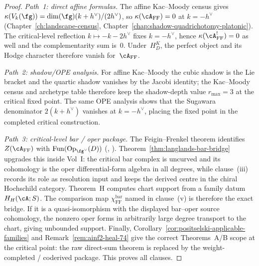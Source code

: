 \begin{proof}
\emph{Path~1: direct affine formulas.}
The affine Kac--Moody census gives
$\kappa(V_k(\fg)) = \dim(\fg)(k+h^\vee)/(2h^\vee)$, so
$\kappa(\cA_{\mathrm{FF}})=0$ at $k=-h^\vee$
\textup{(}Chapter~\ref{ch:landscape-census},
Chapter~\ref{chap:shadow-quadrichotomy-platonic}\textup{)}.
The critical-level reflection \(k \mapsto -k-2h^\vee\) fixes
$k=-h^\vee$, hence $\kappa(\cA_{\mathrm{FF}}^{!})=0$ as well and the
complementarity sum is~$0$.  Under~$H_D^K$, the perfect object and
its Hodge character therefore vanish for~$\cA_{\mathrm{FF}}$.

\emph{Path~2: shadow/OPE analysis.}
For affine Kac--Moody the cubic shadow is the Lie bracket and the
quartic shadow vanishes by the Jacobi identity; the Kac--Moody census
and archetype table therefore keep the shadow-depth value
$r_{\max}=3$ at the critical fixed point. The same OPE analysis shows
that the Sugawara denominator $2(k+h^\vee)$ vanishes at $k=-h^\vee$,
placing the fixed point in the completed critical construction.

\emph{Path~3: critical-level bar / oper package.}
The Feigin--Frenkel theorem identifies
$Z(\cA_{\mathrm{FF}})$ with
$\operatorname{Fun}(\mathrm{Op}_{\fg^\vee}(D))$
\textup{(}\cite{Feigin-Frenkel}, \cite{Fre07}\textup{)}.
Theorem~\ref{thm:langlands-bar-bridge} upgrades this inside Vol~I:
the critical bar complex is uncurved and its cohomology is the oper
differential-form algebra in all degrees, while clause~(iii) records
its role as resolution input and keeps the derived centre in the
chiral Hochschild category. Theorem~H computes chart support from a
family datum $H_H(\cA;S)$. The comparison map
$\chi_{\mathrm{FF}}^{\mathrm{bar}}$ named in clause~(v) is therefore
the exact bridge. If it is a quasi-isomorphism with the displayed
bar--oper source cohomology, the nonzero oper forms in arbitrarily
large degree transport to the chart, giving unbounded support.
Finally, Corollary~\ref{cor:positselski-applicable-families} and
Remark~\ref{rem:ainf2-heal-74} give the correct Theorems~A/B scope at
the critical point: the raw direct-sum theorem is replaced by the
weight-completed / coderived package. This proves all clauses.
\end{proof}

